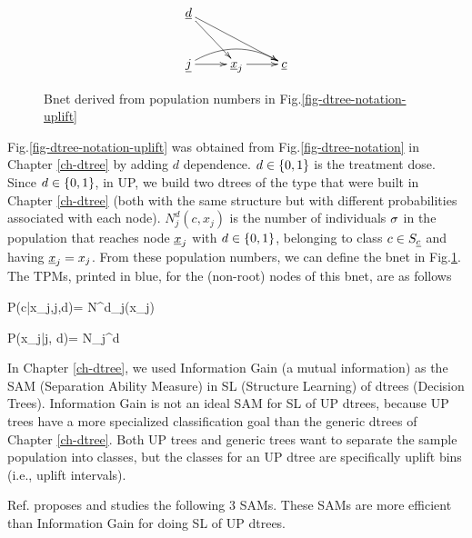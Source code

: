 \begin{figure}
$$
\xymatrix{
\rvd\ar[dr]\ar[drr]
\\
\rvj
\ar[r]\ar@/^1pc/[rr]
&
\rvx_j\ar[r]
&
\rvc
}$$
\caption{Bnet derived from population
numbers in Fig.\ref{fig-dtree-notation-uplift}}
\label{fig-class-bnet-uplift}
\end{figure}



Fig.\ref{fig-dtree-notation-uplift}
was obtained from Fig.\ref{fig-dtree-notation}
in Chapter \ref{ch-dtree}
by adding $d$ dependence.
$d\in \{0,1\}$
is the treatment dose.
Since $d\in \{0,1\}$,
in UP, we build two dtrees
of the type that were built
in Chapter \ref{ch-dtree}
(both with the same structure
but with different 
probabilities associated with each 
node).
$N^d_j(c, x_j)$ is 
the number
of individuals $\sigma$
in the population that reaches node ${\underline{x}}_j$
with $d\in \{0,1\}$, belonging
to class $c\in S_{\underline{c}}$ and having ${\underline{x}}_j=x_j$. 
From these population numbers, we can define
the bnet in Fig.\ref{fig-class-bnet-uplift}.
The TPMs, printed in blue,
for the (non-root) nodes of this bnet, are as follows



\beq\color{blue}
P(c|x_j,j,d)=
{N^d_j(x_j)}
\label{eq-p-c-pre-laplace}
\eeq

\beq\color{blue}
P(x_j|j, d)=
{N_j^d}
\eeq


In Chapter
\ref{ch-dtree},
we used Information 
Gain
(a mutual information)
as the SAM (Separation Ability Measure)
in
SL (Structure Learning) 
of dtrees (Decision Trees).
Information Gain
is not an ideal
SAM for SL of UP dtrees,
because UP trees
have a more
specialized classification goal
than the generic dtrees of Chapter \ref{ch-dtree}.
Both UP trees and generic trees
want to
separate the sample
population into classes,
but the classes for an UP dtree 
are specifically uplift bins (i.e., uplift intervals).


Ref.\cite{jaros}
proposes and studies 
the following
3 SAMs. These SAMs 
are more efficient than
Information Gain
for doing SL of UP dtrees.


